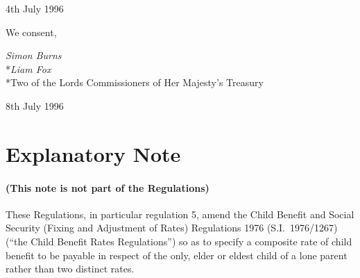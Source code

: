 \documentclass[a4paper]{article}
\newcommand{\parthead}{}
\begin{document}
4th July 1996

\bigskip

We consent,

{\raggedleft
\emph{Simon Burns}\\*\emph{Liam Fox}\\*Two of the Lords Commissioners of Her Majesty’s Treasury

}

8th July 1996

\part{Explanatory Note}

\renewcommand\parthead{--- Explanatory Note}

\subsection*{(This note is not part of the Regulations)}

These Regulations, in particular regulation 5, amend the Child Benefit and Social Security (Fixing and Adjustment of Rates) Regulations 1976 (S.I.\ 1976/1267) (“the Child Benefit Rates Regulations”) so as to specify a composite rate of child benefit to be payable in respect of the only, elder or eldest child of a lone parent rather than two distinct rates.
\end{document}
